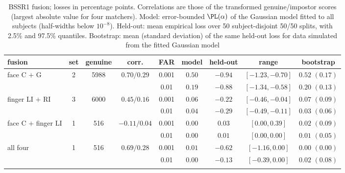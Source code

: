 \begin{table}[t]
\caption{BSSR1 fusion; losses in percentage points. Correlations are those of the transformed genuine/impostor scores (largest absolute value for four matchers). Model: error-bounded $\PL(\alpha)$ of the Gaussian model fitted to all subjects (half-widths below $10^{-8}$). Held-out: mean empirical loss over 50 subject-disjoint 50/50 splits, with 2.5\% and 97.5\% quantiles. Bootstrap: mean (standard deviation) of the same held-out loss for data simulated from the fitted Gaussian model}\label{tab:bssr1}
\footnotesize\setlength{\tabcolsep}{3pt}
\begin{tabular*}{\textwidth}{@{\extracolsep\fill}lcccccccc@{}}
\toprule
fusion & set & genuine & corr. & FAR & model & held-out & range & bootstrap\\
\midrule
face C $+$ G & 2 & 5988 & $0.70/0.29$ & 0.001 & $0.50$ & $-0.94$ & $[-1.23, -0.70]$ & $0.52$ $(0.17)$\\
 & & &  & 0.01 & $0.19$ & $-0.88$ & $[-1.34, -0.58]$ & $0.20$ $(0.13)$\\
\midrule
finger LI $+$ RI & 3 & 6000 & $0.45/0.16$ & 0.001 & $0.06$ & $-0.22$ & $[-0.46, -0.04]$ & $0.07$ $(0.09)$\\
 & & &  & 0.01 & $0.04$ & $-0.29$ & $[-0.49, -0.11]$ & $0.03$ $(0.06)$\\
\midrule
face C $+$ finger LI & 1 & 516 & $-0.11/0.04$ & 0.001 & $0.00$ & $0.03$ & $[0.00, 0.39]$ & $0.02$ $(0.09)$\\
 & & &  & 0.01 & $0.00$ & $0.01$ & $[0.00, 0.00]$ & $0.01$ $(0.05)$\\
\midrule
all four & 1 & 516 & $0.69/0.28$ & 0.001 & $0.01$ & $-0.62$ & $[-1.16, 0.00]$ & $0.00$ $(0.00)$\\
 & & &  & 0.01 & $0.00$ & $-0.13$ & $[-0.39, 0.00]$ & $0.02$ $(0.08)$\\
\botrule
\end{tabular*}
\end{table}
